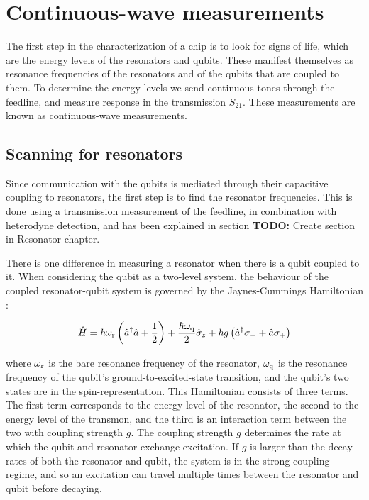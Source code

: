     \section{Continuous-wave measurements}
      \label{sec:Continuous-wave measurements}
      The first step in the characterization of a chip is to look for signs of life, which are the energy levels of the resonators and qubits. These manifest themselves as resonance frequencies of the resonators and of the qubits that are coupled to them. To determine the energy levels we send continuous tones through the feedline, and measure response in the transmission $S_{21}$. These measurements are known as continuous-wave measurements.

      \subsection{Scanning for resonators}
        \label{sec:resonator-scan}
        Since communication with the qubits is mediated through their capacitive coupling to resonators, the first step is to find the resonator frequencies. This is done using a transmission measurement of the feedline, in combination with heterodyne detection, and has been explained in section \textbf{TODO:} Create section in Resonator chapter.

        There is one difference in measuring a resonator when there is a qubit coupled to it. When considering the qubit as a two-level system, the behaviour of the coupled resonator-qubit system is governed by the Jaynes-Cummings Hamiltonian \cite{koch2007Transmon}:

        \begin{equation}
          \hat{H} = \hbar \omega_\text{r}\left(\hat{a}^\dagger \hat{a} + \frac{1}{2} \right) + \frac{\hbar \omega_\text{q}}{2}\hat{\sigma}_z + \hbar g \left(\hat{a}^\dagger \sigma_{-} + \hat{a}\sigma_{+}\right)
          \label{eq:Jaynes-Cummings}
        \end{equation}

        where $\omega_\text{r}$ is the bare resonance frequency of the resonator, $\omega_\text{q}$ is the resonance frequency of the qubit's ground-to-excited-state transition, and the qubit's two states are in the spin-representation. This Hamiltonian consists of three terms. The first term corresponds to the energy level of the resonator, the second to the energy level of the transmon, and the third is an interaction term between the two with coupling strength $g$. The coupling strength $g$ determines the rate at which the qubit and resonator exchange excitation. If $g$ is larger than the decay rates of both the resonator and qubit, the system is in the strong-coupling regime, and so an excitation can travel multiple times between the resonator and qubit before decaying.

